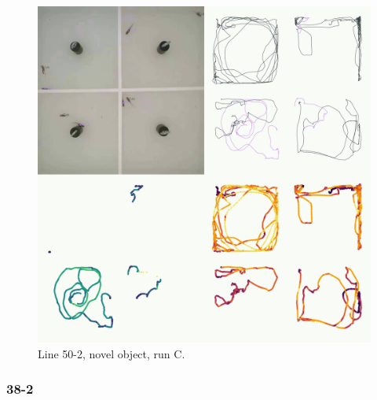 \documentclass[
]{book}
\begin{document}
\begin{figure}
\includegraphics[width=1\linewidth]{figs/mikk_behaviour/four_panel_plots/novel_object_20191120_1150_50-2_R_C_300} \caption{Line 50-2, novel object, run C.}\label{fig:4p-50-2-no-C}
\end{figure}

\hypertarget{section-9}{%
\subsubsection{38-2}\label{section-9}}
\end{document}
